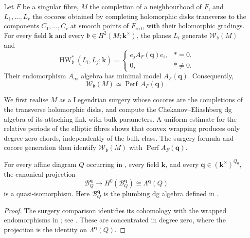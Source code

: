 \documentclass[a4paper]{amsart}
\newcommand{\kk}{\mathbf{k}}
\DeclareMathOperator{\HW}{HW}
\DeclareMathOperator{\Perf}{Perf}
\numberwithin{equation}{section}
\begin{document}
\begin{theorem}\label{thm:main}
Let $F$ be a singular fibre, $M$ the completion of a
neighbourhood of $F$, and $L_1,\ldots,L_r$ the cocores obtained by
completing holomorphic disks transverse to the components
$C_1,\ldots,C_r$ at smooth points of $F_{\mathrm{red}}$, with their
holomorphic gradings. For every field $\kk$ and every
$\mathfrak{b}\in H^2(M;\kk^\times)$, the planes $L_i$ generate
$\mathcal W_{\mathfrak{b}}(M)$ and
\[
\HW_{\mathfrak{b}}^*(L_i,L_j;\kk)=
\begin{cases}
e_jA_F(\boldsymbol q)e_i,&*=0,\\
0,&*\ne0.
\end{cases}
\]
Their endomorphism $A_\infty$ algebra has minimal model
$A_F(\boldsymbol q)$. Consequently,
\[
 \mathcal W_{\mathfrak{b}}(M)
 \simeq\Perf\, A_F(\boldsymbol q).
\]
\end{theorem}

We first realise $M$ as a Legendrian surgery whose cocores are the
completions of the transverse holomorphic disks, and compute the
Chekanov--Eliashberg dg algebra of its attaching link with bulk
parameters. A uniform estimate for the relative periods of the elliptic
fibres shows that convex wrapping produces only degree-zero chords,
independently of the bulk class. The surgery formula and cocore
generation then identify $\mathcal W_{\mathfrak b}(M)$ with
$\Perf A_F(\boldsymbol q)$.

\begin{corollary}\label{cor:affine-formality}
For every affine diagram $Q$ occurring in , every
field $\kk$, and every $\boldsymbol q\in(\kk^\times)^{Q_0}$, the
canonical projection
\[
 \mathcal B_Q^{\boldsymbol q}\longrightarrow
 H^0(\mathcal B_Q^{\boldsymbol q})\cong\Lambda^{\boldsymbol q}(Q)
\]
is a quasi-isomorphism. Here $\mathcal B_Q^{\boldsymbol q}$ is the
plumbing dg algebra defined in .
\end{corollary}

\begin{proof}
The surgery comparison identifies its cohomology with the wrapped
endomorphisms in ; see .
These are concentrated in degree zero, where the projection is the
identity on $\Lambda^{\boldsymbol q}(Q)$.
\end{proof}
\end{document}
